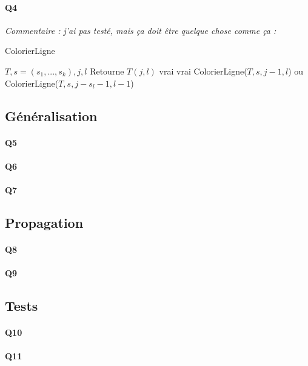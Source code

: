 \documentclass[12pt]{article}
\begin{document}
			\paragraph{Q4}
				\textit{Commentaire : j'ai pas testé, mais ça doit être quelque chose comme ça :}
				
				\begin{algorithm} [H]
					\caption{ColorierLigne}
					\label{color_ligne}
					\begin{algorithmic}
						\REQUIRE $T, s=(s_1,...,s_k), j, l$ 
						\ENSURE Retourne $ T(j,l) $
							\RETURN vrai
							\RETURN vrai
						\ELSE
							\RETURN ColorierLigne($ T,s,j-1,l $) ou ColorierLigne($ T,s,j-s_l-1,l-1 $)
						\ENDIF
					\end{algorithmic}
				\end{algorithm}
		
		\subsection{Généralisation}
		
			\paragraph{Q5}
			\paragraph{Q6}
			\paragraph{Q7}
		
		\subsection{Propagation}
				
			
			\paragraph{Q8}
			\paragraph{Q9}
			
		\subsection{Tests}
			
			\paragraph{Q10}
			\paragraph{Q11}
						
\end{document}
